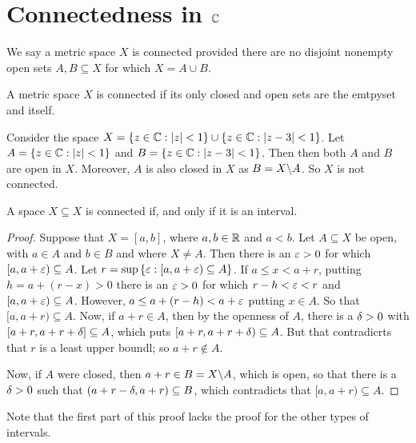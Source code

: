 \section{Connectedness in $\mathbb{C}$}

\begin{definition}
    We say a metric space $X$ is connected provided there are no disjoint
    nonempty open sets  $A,B \subseteq X$ for which  $X=A \cup B$.
\end{definition}

\begin{lemma}\label{2.2.1}
    A metric space $X$ is connected if its only closed and open sets are the
    emtpyset and itself.
\end{lemma}

\begin{example}\label{example_2.5}
    Consider the space $X=\{z \in \mathbb{C} : |z|<1\} \cup \{z \in \mathbb{C} : |z-3|<1\}$.
    Let $A=\{z \in \mathbb{C} : |z|<1\}$ and $B=\{z \in \mathbb{C} : |z-3|<1\}$. Then then
    both $A$ and $B$ are open in  $X$. Moreover,  $A$ is also closed in $X$ as
    $B=X \backslash A$. So $X$ is not connected.
\end{example}

\begin{lemma}\label{2.2.2}
    A space $X \subseteq X$ is connected if, and only if it is an interval.
\end{lemma}
\begin{proof}
    Suppose that $X=[a,b]$, where $a,b \in \mathbb{R}$ and  $a<b$. Let  $A \subseteq X$
    be open, with  $a \in A$ and  $b \in B$ and where $X \neq A$. Then there is
    an $\varepsilon>0$ for which  $[a,a+\varepsilon) \subseteq A$. Let $r=\sup{\{\varepsilon: [a,a+\varepsilon)
    \subseteq A\}}$. If $a \leq x <a+r$, putting  $h=a+(r-x)>0$ there is an $\varepsilon
    > 0$ for which  $r-h<\varepsilon<r$ and $[a,a+\varepsilon) \subseteq A$. However, $a \leq
    a+(r-h)<a+\varepsilon$ putting $x \in A$. So that  $[a,a+r) \subseteq A$. Now, if
    $a+r \in A$, then by the openness of  $A$, there is a  $\delta>0$ with
    $[a+r,a+r+\delta] \subseteq A$, which puts $[a+r,a+r+\delta) \subseteq A$. But that
    contradicrts that $r$ is a least upper boundl; so $a+r \notin A$.

    Now, if $A$ were closed, then  $a+r \in B=X \backslash A$, which is open, so
    that there is a $\delta>0$ such that  $(a+r-\delta,a+r) \subseteq B$, which
    contradicts that $[a,a+r) \subseteq A$.
\end{proof}
\begin{remark}
    Note that the first part of this proof lacks the proof for the other types
    of intervals.
\end{remark}

